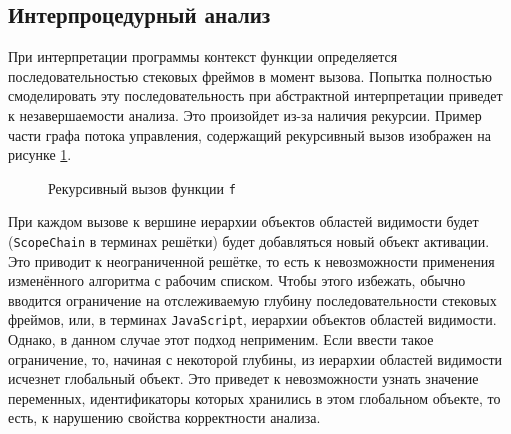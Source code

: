 \subsection{Интерпроцедурный анализ}%
\label{sec:interproc}
При интерпретации программы контекст функции определяется
последовательностью стековых фреймов в момент вызова. Попытка
полностью смоделировать эту последовательность при абстрактной
интерпретации приведет к незавершаемости анализа. Это произойдет из-за
наличия рекурсии. Пример части графа потока управления, содержащий
рекурсивный вызов изображен на рисунке \ref{fig:recursion}.
\begin{figure}[htp]
\centering
{}
\caption{Рекурсивный вызов функции \texttt{f}}
\label{fig:recursion}
\end{figure}%
При каждом вызове к вершине иерархии объектов областей видимости будет
(\texttt{ScopeChain} в терминах решётки) будет добавляться новый объект
активации. Это приводит к неограниченной решётке, то есть к
невозможности применения изменённого алгоритма с рабочим списком.
Чтобы этого избежать, обычно \cite{Nielson1999} вводится ограничение
на отслеживаемую глубину последовательности стековых фреймов, или, в
терминах \texttt{JavaScript}, иерархии объектов областей видимости.
Однако, в данном случае этот подход неприменим. Если ввести такое
ограничение, то, начиная с некоторой глубины, из иерархии областей
видимости исчезнет глобальный объект. Это приведет к невозможности
узнать значение переменных, идентификаторы которых хранились в этом
глобальном объекте, то есть, к нарушению свойства корректности
анализа.

